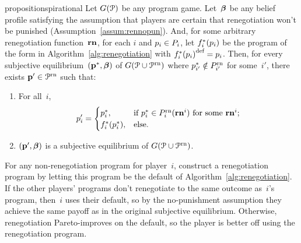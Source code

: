 \documentclass[sigconf]{aamas}
\newcommand{\allprogrn}{\allprog^{\text{rn}}}
\theoremstyle{definition}
\begin{document}

\begin{restatable}{proposition}{spirational}
\label{prop:simultaneous}
Let $G(\mathcal{P})$
be any program game.
Let~$\boldsymbol{\beta}$ be any belief profile
satisfying the assumption
that players
are certain 
that renegotiation won't be punished 
(Assumption~\ref{assum:rennopun}).
And, for some arbitrary renegotiation function~$\mathbf{rn}$, for each $i$ and $p_i \in P_i$, let $f_i^*(p_i)$
be the program
of the form in Algorithm~\ref{alg:renegotiation} with 
${f_i^*(p_i)}^{\textnormal{def}} = p_i$.
Then,
for every
subjective equilibrium~$(\textbf{p}^*, \boldsymbol{\beta})$
of $\game(\allprog \cup \allprogrn)$
where $p_{i'}^* \notin P_{i'}^{\textnormal{rn}}$ for some~$i'$,
there exists $\fullprog' \in \allprogrn$
such that:
\begin{enumerate}
    \item For all~$i$, $$p_i' = \begin{cases}
        p_i^*,& \text{if $p_i^* \in P_i^{\textnormal{rn}}(\mathbf{rn}^i)$ for some $\mathbf{rn}^i$;} \\
        f_i^*(p_i^*),& \text{else.}
    \end{cases}$$
    \item $(\textbf{p}', \boldsymbol{\beta})$
    is a subjective equilibrium
    of  $\game(\allprog \cup \allprogrn)$.
\end{enumerate}
\end{restatable}

\begin{sketch}
For any non-renegotiation
program for player~$i$,
construct
a renegotiation program
by letting this program be
the default of
Algorithm~\ref{alg:renegotiation}.
If the other players'
programs
don't renegotiate
to the same outcome
as~$i$'s program,
then~$i$ uses their default,
so by the no-punishment assumption
they achieve the same payoff as in the original subjective
equilibrium.
Otherwise,
renegotiation
Pareto-improves on the default,
so the player is 
better off
using the renegotiation program.
\end{sketch}
\end{document}
